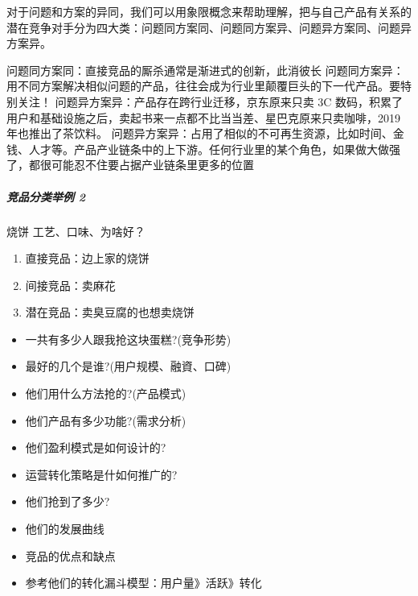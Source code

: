 \documentclass[letterpaper,11pt,english]{sphinxmanual}
\begin{document}
对于问题和方案的异同，我们可以用象限概念来帮助理解，把与自己产品有关系的潜在竞争对手分为四大类：问题同方案同、问题同方案异、问题异方案同、问题异方案异。

问题同方案同：直接竞品的厮杀通常是渐进式的创新，此消彼长
问题同方案异：用不同方案解决相似问题的产品，往往会成为行业里颠覆巨头的下一代产品。要特别关注！
问题异方案异：产品存在跨行业迁移，京东原来只卖 3C
数码，积累了用户和基础设施之后，卖起书来一点都不比当当差、星巴克原来只卖咖啡，2019
年也推出了茶饮料。
问题异方案异：占用了相似的不可再生资源，比如时间、金钱、人才等。产品产业链条中的上下游。任何行业里的某个角色，如果做大做强了，都很可能忍不住要占据产业链条里更多的位置


\subparagraph{竞品分类举例 2\sphinxfootnotemark[176]}
\label{\detokenize{chapter_skill/goods_analysis:id14}}%
\begin{footnotetext}[176]\sphinxAtStartFootnote
{}
%
\end{footnotetext}\ignorespaces 
烧饼 工艺、口味、为啥好？
\begin{enumerate}
%
\item {} 
直接竞品：边上家的烧饼

\item {} 
间接竞品：卖麻花

\item {} 
潜在竞品：卖臭豆腐的也想卖烧饼

\end{enumerate}
\begin{itemize}
\item {} 
一共有多少人跟我抢这块蛋糕?(竞争形势)

\item {} 
最好的几个是谁?(用户规模、融資、口碑)

\item {} 
他们用什么方法抢的?(产品模式)

\item {} 
他们产品有多少功能?(需求分析)

\item {} 
他们盈利模式是如何设计的?

\item {} 
运营转化策略是什如何推广的?

\item {} 
他们抢到了多少?

\item {} 
他们的发展曲线

\item {} 
竞品的优点和缺点

\item {} 
参考他们的转化漏斗模型：用户量\sphinxhyphen{}》活跃\sphinxhyphen{}》转化

\end{itemize}
\end{document}
